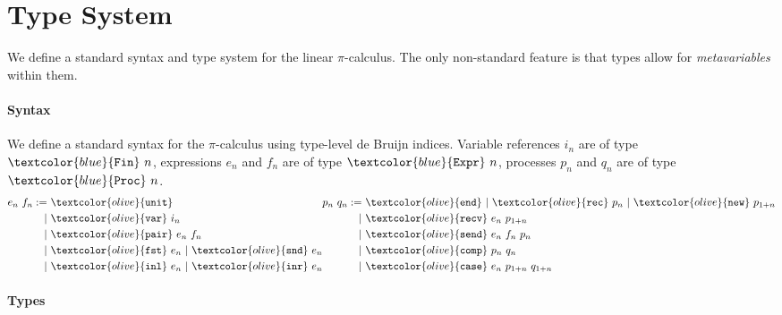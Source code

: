 \documentclass[sigplan,screen,review]{acmart}
\theoremstyle{definition}\newtheorem{mytheorem}{Theorem}[section]
\newcommand{\picalc}{$\pi$-calculus}
\newcommand{\constr}[1]{\textcolor{olive}{\mathtt{#1}}}
\newcommand{\type}[1]{\textcolor{blue}{\mathtt{#1}}}
\newcommand{\Fin}[1]{\type{Fin}~#1}
\newcommand{\sExpr}[1]{\type{Expr}~#1}
\newcommand{\sProc}[1]{\type{Proc}~#1}
\newcommand{\sunit}{\constr{unit}}
\newcommand{\svar}{\constr{var}}
\newcommand{\sfst}{\constr{fst}}
\newcommand{\ssnd}{\constr{snd}}
\newcommand{\sinl}{\constr{inl}}
\newcommand{\sinr}{\constr{inr}}
\newcommand{\spair}{\constr{pair}}
\newcommand{\send}{\constr{end}}
\newcommand{\snew}{\constr{new}}
\newcommand{\scomp}{\constr{comp}}
\newcommand{\srecv}{\constr{recv}}
\newcommand{\ssend}{\constr{send}}
\newcommand{\scase}{\constr{case}}
\newcommand{\srec}{\constr{rec}}
\begin{document}
\section{Type System}
\label{type-system}

We define a standard syntax and type system for the linear \picalc{}.
The only non-standard feature is that types allow for \emph{metavariables} within them.

\paragraph{Syntax}

We define a standard syntax for the \picalc{} using type-level de Bruijn indices.
Variable references $i_n$ are of type $\Fin{n}$, expressions $e_n$ and $f_n$ are of type $\sExpr{n}$, processes $p_n$ and $q_n$ are of type $\sProc{n}$.
\[
\begin{aligned}[c]
  e_n ~ f_n  :=
  &~ \sunit \\
  |&~ \svar~i_n \\
  |&~ \spair~e_n~f_n \\
  |&~ \sfst~e_n ~|~  \ssnd~e_n \\
  |&~ \sinl~e_n ~|~  \sinr~e_n
\end{aligned}
\begin{aligned}[c]
  p_n ~ q_n  :=
  &~ \send ~|~  \srec~p_n ~|~ \snew~p_{1+n} \\
  |&~ \srecv~e_n~p_{1+n} \\
  |&~ \ssend~e_n~f_n~p_n \\
  |&~ \scomp~p_n~q_n \\
  |&~ \scase~e_n~p_{1+n}~q_{1+n} \\
\end{aligned}
\]

\paragraph{Types}
\label{types}
\end{document}
